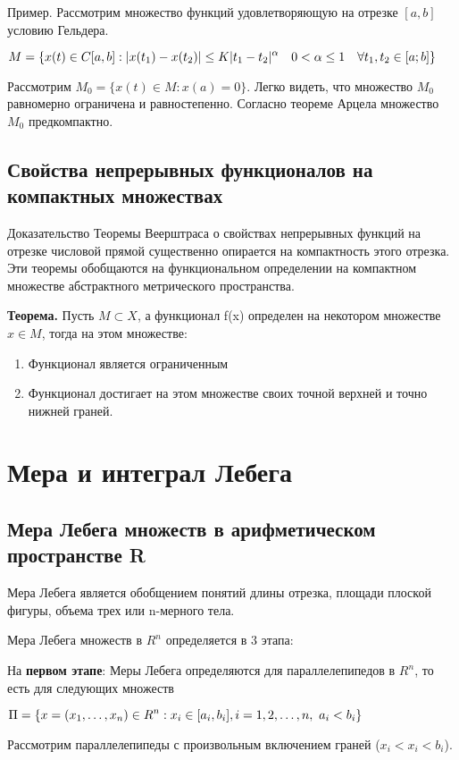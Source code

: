 \documentclass[12pt]{report}
\newcommand{\be}{\begin{enumerate}}
\newcommand{\ee}{\end{enumerate}}
\renewcommand{\[}{$\\\displaystyle}
\renewcommand{\]}{\\$}
\renewcommand{\[}{$\\\displaystyle}
\newcommand{\sep}{,\ }
\newcommand{\tth}[1][]{\textbf{Теорема#1.}}
\begin{document}
Пример. Рассмотрим множество функций удовлетворяющую на отрезке $[a,b]$ условию Гельдера.

\[
M=\{x(t)\in C[a,b]: |x(t_1)-x(t_2)|\leq K|t_1-t_2|^\alpha \quad 0 < \alpha \leq 1 \quad \forall t_1,t_2 \in [a;b]\}
\]

Рассмотрим $M_0=\{x(t)\in M:x(a)=0\}$. Легко видеть, что множество $M_0$ равномерно ограничена и равностепенно. Согласно теореме Арцела множество $M_0$ предкомпактно.

\section{Свойства непрерывных функционалов на компактных множествах}

Доказательство Теоремы Веерштраса о свойствах непрерывных функций на отрезке числовой прямой существенно опирается на компактность этого отрезка. Эти теоремы обобщаются на функциональном определении на компактном множестве абстрактного метрического пространства.

\tth[] Пусть $M\subset X$, а функционал f(x) определен на некотором множестве $x \in M$, тогда на этом множестве:

\be
  \item Функционал является ограниченным
  \item Функционал достигает на этом множестве своих точной верхней и точно нижней граней.
\ee

\chapter{Мера и интеграл Лебега}

\section{Мера Лебега множеств в арифметическом пространстве R}

Мера Лебега является обобщением понятий длины отрезка, площади плоской фигуры, объема трех или n-мерного тела.

Мера Лебега множеств в $R^n$ определяется в 3 этапа:

На \textbf{первом этапе}: Меры Лебега определяются для параллелепипедов в $R^n$, то есть для следующих множеств

\[
  \Pi = \{x=(x_1,\dots,x_n)\in R^n: x_i\in [a_i,b_i], i=1,2,\dots,n\sep a_i<b_i\}
\]

Рассмотрим параллелепипеды с произвольным включением граней ($x_i<x_i<b_i$).
\end{document}

